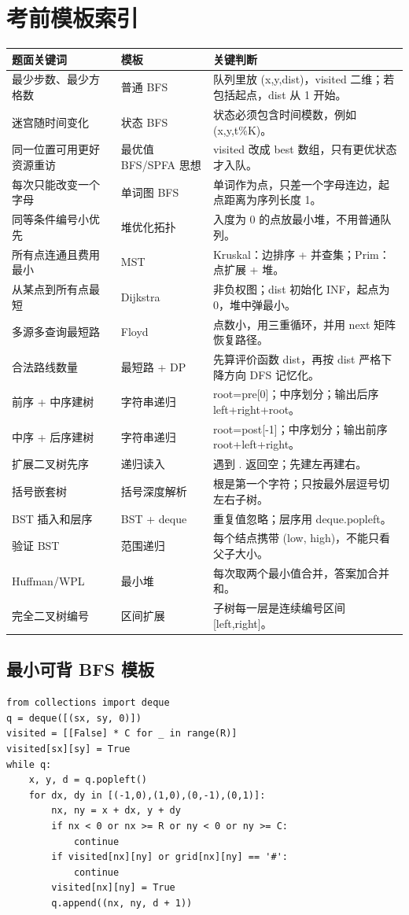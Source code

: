 \documentclass[10pt,a4paper,fontset=none]{ctexart}
\begin{document}
\section{考前模板索引}
\begin{longtable}{p{}p{}p{}}
\toprule
\textbf{题面关键词} & \textbf{模板} & \textbf{关键判断} \\
\midrule
最少步数、最少方格数 & 普通 BFS & 队列里放 (x,y,dist)，visited 二维；若包括起点，dist 从 1 开始。\\
迷宫随时间变化 & 状态 BFS & 状态必须包含时间模数，例如 (x,y,t\%K)。\\
同一位置可用更好资源重访 & 最优值 BFS/SPFA 思想 & visited 改成 best 数组，只有更优状态才入队。\\
每次只能改变一个字母 & 单词图 BFS & 单词作为点，只差一个字母连边，起点距离为序列长度 1。\\
同等条件编号小优先 & 堆优化拓扑 & 入度为 0 的点放最小堆，不用普通队列。\\
所有点连通且费用最小 & MST & Kruskal：边排序 + 并查集；Prim：点扩展 + 堆。\\
从某点到所有点最短 & Dijkstra & 非负权图；dist 初始化 INF，起点为 0，堆中弹最小。\\
多源多查询最短路 & Floyd & 点数小，用三重循环，并用 next 矩阵恢复路径。\\
合法路线数量 & 最短路 + DP & 先算评价函数 dist，再按 dist 严格下降方向 DFS 记忆化。\\
前序 + 中序建树 & 字符串递归 & root=pre[0]；中序划分；输出后序 left+right+root。\\
中序 + 后序建树 & 字符串递归 & root=post[-1]；中序划分；输出前序 root+left+right。\\
扩展二叉树先序 & 递归读入 & 遇到 . 返回空；先建左再建右。\\
括号嵌套树 & 括号深度解析 & 根是第一个字符；只按最外层逗号切左右子树。\\
BST 插入和层序 & BST + deque & 重复值忽略；层序用 deque.popleft。\\
验证 BST & 范围递归 & 每个结点携带 (low, high)，不能只看父子大小。\\
Huffman/WPL & 最小堆 & 每次取两个最小值合并，答案加合并和。\\
完全二叉树编号 & 区间扩展 & 子树每一层是连续编号区间 [left,right]。\\
\bottomrule
\end{longtable}

\subsection*{最小可背 BFS 模板}
\begin{lstlisting}[style=py]
from collections import deque
q = deque([(sx, sy, 0)])
visited = [[False] * C for _ in range(R)]
visited[sx][sy] = True
while q:
    x, y, d = q.popleft()
    for dx, dy in [(-1,0),(1,0),(0,-1),(0,1)]:
        nx, ny = x + dx, y + dy
        if nx < 0 or nx >= R or ny < 0 or ny >= C:
            continue
        if visited[nx][ny] or grid[nx][ny] == '#':
            continue
        visited[nx][ny] = True
        q.append((nx, ny, d + 1))
\end{lstlisting}
\end{document}
